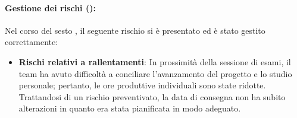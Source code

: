 \paragraph*{Gestione dei rischi ():}
\par Nel corso del sesto , il seguente rischio si è presentato ed è stato gestito correttamente:
\begin{itemize}
  \item \textbf{Rischi relativi a rallentamenti}: In prossimità della sessione di esami, il team ha avuto difficoltà a conciliare l'avanzamento del progetto e lo studio personale; pertanto, le ore produttive individuali sono state ridotte. Trattandosi di un rischio preventivato, la data di consegna non ha subito alterazioni in quanto era stata pianificata in modo adeguato.
\end{itemize}
